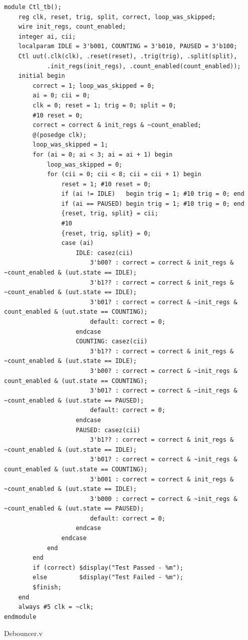 \documentclass[11pt,a4paper]{article}
\begin{document}
\begin{lstlisting}
module Ctl_tb();
    reg clk, reset, trig, split, correct, loop_was_skipped;
    wire init_regs, count_enabled;
    integer ai, cii;
    localparam IDLE = 3'b001, COUNTING = 3'b010, PAUSED = 3'b100;
    Ctl uut(.clk(clk), .reset(reset), .trig(trig), .split(split),
            .init_regs(init_regs), .count_enabled(count_enabled));
    initial begin
        correct = 1; loop_was_skipped = 0;
        ai = 0; cii = 0;
        clk = 0; reset = 1; trig = 0; split = 0;
        #10 reset = 0;
        correct = correct & init_regs & ~count_enabled;
        @(posedge clk);
        loop_was_skipped = 1;
        for (ai = 0; ai < 3; ai = ai + 1) begin
            loop_was_skipped = 0;
            for (cii = 0; cii < 8; cii = cii + 1) begin
                reset = 1; #10 reset = 0;
                if (ai != IDLE)   begin trig = 1; #10 trig = 0; end
                if (ai == PAUSED) begin trig = 1; #10 trig = 0; end
                {reset, trig, split} = cii;
                #10
                {reset, trig, split} = 0;
                case (ai)
                    IDLE: casez(cii)
                        3'b00? : correct = correct & init_regs & ~count_enabled & (uut.state == IDLE);
                        3'b1?? : correct = correct & init_regs & ~count_enabled & (uut.state == IDLE);
                        3'b01? : correct = correct & ~init_regs & count_enabled & (uut.state == COUNTING);
                        default: correct = 0;
                    endcase
                    COUNTING: casez(cii)
                        3'b1?? : correct = correct & init_regs & ~count_enabled & (uut.state == IDLE);
                        3'b00? : correct = correct & ~init_regs & count_enabled & (uut.state == COUNTING);
                        3'b01? : correct = correct & ~init_regs & ~count_enabled & (uut.state == PAUSED);
                        default: correct = 0;
                    endcase
                    PAUSED: casez(cii)
                        3'b1?? : correct = correct & init_regs & ~count_enabled & (uut.state == IDLE);
                        3'b01? : correct = correct & ~init_regs & count_enabled & (uut.state == COUNTING);
                        3'b001 : correct = correct & init_regs & ~count_enabled & (uut.state == IDLE);
                        3'b000 : correct = correct & ~init_regs & ~count_enabled & (uut.state == PAUSED);
                        default: correct = 0;
                    endcase
                endcase
            end
        end
        if (correct) $display("Test Passed - %m");
        else         $display("Test Failed - %m");
        $finish;
    end
    always #5 clk = ~clk;
endmodule
\end{lstlisting}
\vspace{2 cm}
Debouncer.v
\end{document}
